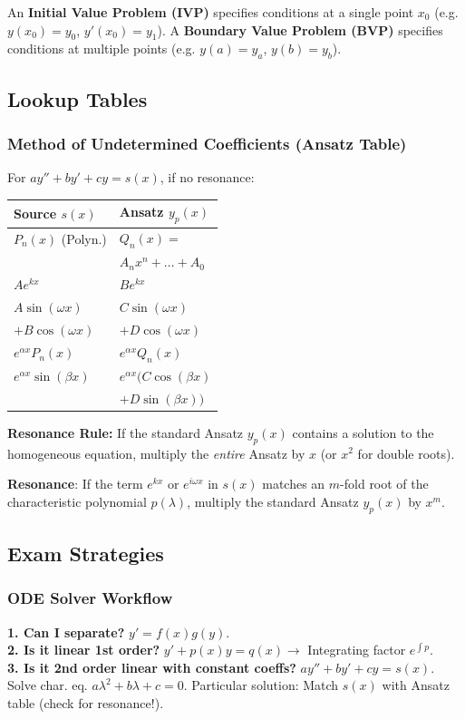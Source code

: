 \begin{definition}
    An \textbf{Initial Value Problem (IVP)} specifies conditions at a single point $x_0$ (e.g. $y(x_0) = y_0$, $y'(x_0) = y_1$).
    A \textbf{Boundary Value Problem (BVP)} specifies conditions at multiple points (e.g. $y(a) = y_a$, $y(b) = y_b$).
\end{definition}


\subsection{Lookup Tables}

\subsubsection{Method of Undetermined Coefficients (Ansatz Table)}
For $ay'' + by' + cy = s(x)$, if no resonance:
\begin{center}
\scriptsize
\setlength{\tabcolsep}{2pt}
\begin{tabular}{|l|l|}
\hline
\textbf{Source $s(x)$} & \textbf{Ansatz $y_p(x)$} \\ \hline
$P_n(x)$ (Polyn.) & $Q_n(x) = $ \\
& $A_n x^n + \dots + A_0$ \\ \hline
$A e^{kx}$ & $B e^{kx}$ \\ \hline
$A \sin(\omega x)$ & $C \sin(\omega x)$ \\
$+ B \cos(\omega x)$ & $+ D \cos(\omega x)$ \\ \hline
$e^{\alpha x} P_n(x)$ & $e^{\alpha x} Q_n(x)$ \\ \hline
$e^{\alpha x} \sin(\beta x)$ & $e^{\alpha x} (C \cos(\beta x)$ \\
& $+ D \sin(\beta x))$ \\ \hline
\end{tabular}
\end{center}
\textbf{Resonance Rule:} If the standard Ansatz $y_p(x)$ contains a solution to the homogeneous equation, multiply the \textit{entire} Ansatz by $x$ (or $x^2$ for double roots).

\begin{important}
    \textbf{Resonance}: If the term $e^{kx}$ or $e^{i\omega x}$ in $s(x)$ matches an $m$-fold root of the characteristic polynomial $p(\lambda)$, multiply the standard Ansatz $y_p(x)$ by $x^m$.
\end{important}


\subsection{Exam Strategies}

\subsubsection{ODE Solver Workflow}
\textbf{1. Can I separate?} $y' = f(x)g(y)$. \\
\textbf{2. Is it linear 1st order?} $y' + p(x)y = q(x) \to$ Integrating factor $e^{\int p}$. \\
\textbf{3. Is it 2nd order linear with constant coeffs?} $ay'' + by' + cy = s(x)$. Solve char. eq. $a\lambda^2 + b\lambda + c = 0$. Particular solution: Match $s(x)$ with Ansatz table (check for resonance!).
